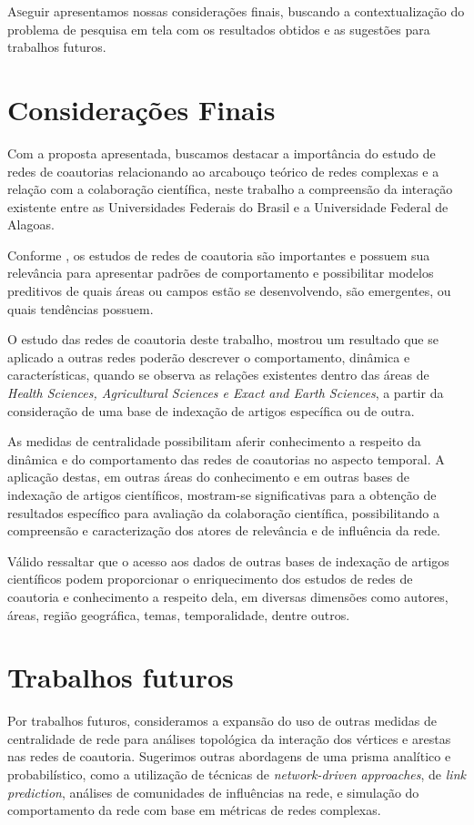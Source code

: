 
\lettrine{A} seguir apresentamos nossas considerações finais, buscando a contextualização do problema de pesquisa em tela com os resultados obtidos e as sugestões para trabalhos futuros.

\section{\textbf{Considerações Finais}} 

Com a proposta apresentada, buscamos destacar a importância do estudo de redes de coautorias relacionando ao arcabouço teórico de redes complexas e a relação com a colaboração científica, neste trabalho a compreensão da interação existente entre as Universidades Federais do Brasil e a Universidade Federal de Alagoas.

Conforme \citep{Barabasi2001}, os estudos de redes de coautoria são importantes e possuem sua relevância para apresentar padrões de comportamento e possibilitar modelos preditivos de quais áreas ou campos estão se desenvolvendo, são emergentes, ou quais tendências possuem.

O estudo das redes de coautoria deste trabalho, mostrou um resultado que se aplicado a outras redes poderão descrever o comportamento, dinâmica e características, quando se observa as relações existentes dentro das áreas de \textit{Health Sciences, Agricultural Sciences e Exact and Earth Sciences}, a partir da consideração de uma base de indexação de artigos específica ou de outra.

As medidas de centralidade possibilitam aferir conhecimento a respeito da dinâmica e do comportamento das redes de coautorias no aspecto temporal. A aplicação destas, em outras áreas do conhecimento e em outras bases de indexação de artigos científicos, mostram-se significativas para a obtenção de resultados específico para avaliação da colaboração científica, possibilitando a compreensão e caracterização dos atores de relevância e de influência da rede.

Válido ressaltar que o acesso aos dados de outras bases de indexação de artigos científicos podem proporcionar o enriquecimento dos estudos de redes de coautoria e conhecimento a respeito dela, em diversas dimensões como autores, áreas, região geográfica, temas, temporalidade, dentre outros.


\section{\textbf{Trabalhos futuros}}

Por trabalhos futuros, consideramos a expansão do uso de outras medidas de centralidade de rede para análises topológica da interação dos vértices e arestas nas redes de coautoria. Sugerimos outras abordagens de uma prisma analítico e probabilístico, como a utilização de técnicas de \textit{network-driven approaches}, de \textit{link prediction}, análises de comunidades de influências na rede, e simulação do comportamento da rede com base em métricas de redes complexas.



 
